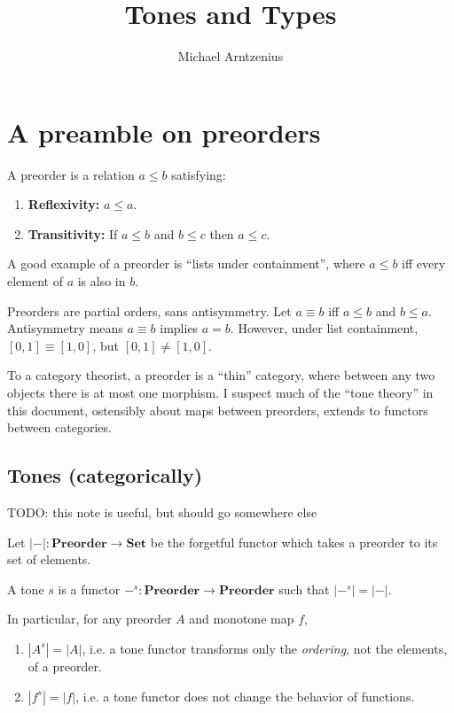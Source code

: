 \documentclass[acmsmall, screen, dvipsnames]{acmart}
\title{Tones and Types}
\author{Michael Arntzenius}
\date{\todo{16 November 2017 -- ???}}
\newcommand{\todo}[1]{{\color{red}#1}}
\newcommand{\mb}[1]{\ensuremath{\mathbf{#1}}}
\newcommand{\mc}[1]{\ensuremath{\mathcal{#1}}}
\begin{document}
\maketitle

\section{A preamble on preorders}

A preorder is a relation $a \le b$ satisfying:
\begin{enumerate}
\item \textbf{Reflexivity:} $a \le a$.
\item \textbf{Transitivity:} If $a \le b$ and $b \le c$ then $a \le c$.
\end{enumerate}

A good example of a preorder is ``lists under containment'', where $a \le b$ iff
every element of $a$ is also in $b$.

Preorders are partial orders, sans antisymmetry. Let $a \equiv b$ iff $a \le b$
and $b \le a$. Antisymmetry means $a \equiv b$ implies $a = b$. However, under
list containment, $[0,1] \equiv [1,0]$, but $[0,1] \ne [1,0]$.

To a category theorist, a preorder is a ``thin'' category, where between any two
objects there is at most one morphism. I suspect much of the ``tone theory'' in
this document, ostensibly about maps between preorders, extends to functors
between categories.


\subsection{Tones (categorically)}

\todo{TODO: this note is useful, but should go somewhere else}

\newcommand{\elemset}[1]{\ensuremath{\mc{U}({#1})}}
\newcommand{\elemsetfn}[0]{\mc{U}}
\renewcommand{\elemset}[1]{\ensuremath{|{#1}|}}
\renewcommand{\elemsetfn}[0]{\elemset{-}}

Let $\elemsetfn{} : \mb{Preorder} \to \mb{Set}$ be the forgetful functor which
takes a preorder to its set of elements.

\begin{definition}
  A tone $s$ is a functor $-^s : \mb{Preorder} \to \mb{Preorder}$ such that
  $\elemset{-^s} = \elemsetfn$.
\end{definition}

In particular, for any preorder $A$ and monotone map $f$,
\begin{enumerate}
\item $|A^s| = |A|$, i.e. a tone functor transforms only the \emph{ordering},
  not the elements, of a preorder.
\item $|f^s| = |f|$, i.e. a tone functor does not change the behavior of
  functions.
\end{enumerate}
\end{document}
